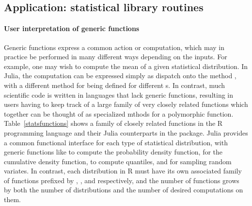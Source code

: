 \documentclass[pldi]{sigplanconf-pldi15}
\begin{document}
\subsection{Application: statistical library routines}

\paragraph{User interpretation of generic functions}
Generic functions express a common action or computation, which may in
practice be performed in many different ways depending on the inputs. For
example, one may wish to compute the mean of a given statistical distribution.
In Julia, the computation can be expressed simply as dispatch onto the method
, with a different method for  being
defined for different s. In contrast, much scientific code
is written in languages that lack generic functions, resulting in users having
to keep track of a large family of very closely related functions which
together can be thought of as specialized mthods for a polymorphic function.
Table~\ref{statsfunctions} shows a family of closely related functions in the R
programming language and their Julia counterparts in the
 package. Julia provides a common functional interface
for each type of statistical distribution, with generic functions like
 to compute the probability density function,  for the
cumulative density function,  to compute quantiles, and
 for sampling random variates. In contrast, each distribution in R
must have its own associated family of functions prefixed by ,
,  and  respectively, and the number of functions grows
by both the number of distributions and the number of desired computations on
them.
\end{document}
